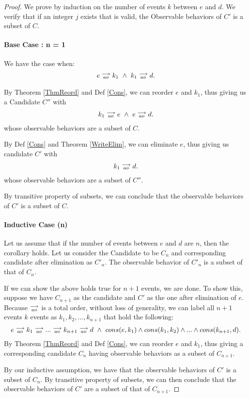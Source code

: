 \begin{proof}
    We prove by induction on the number of events $k$ between $e$ and $d$.
    We verify that if an integer $j$ exists that is valid, the Observable behaviors of $C'$ is a subset of $C$.

    \paragraph{Base Case : n = 1}

        We have the case when:
        \begin{align*}
            e\stackrel{\longrightarrow}{_{ao}}k_1 \ \wedge \ k_1\stackrel{\longrightarrow}{_{ao}}d.
        \end{align*}

        By Theorem \ref{ThmReord} and Def \ref{Cons}, we can reorder $e$ and $k_1$, thus giving us a Candidate $C''$ with 
        \begin{align*}
            k_1\stackrel{\longrightarrow}{_{ao}}e \ \wedge \ e\stackrel{\longrightarrow}{_{ao}}d.
        \end{align*}  
        whose observable behaviors are a subset of $C$.

        By Def \ref{Cons} and Theorem \ref{WriteElim}, we can eliminate $e$, thus giving us candidate $C'$  with  
        \begin{align*}
            k_1\stackrel{\longrightarrow}{_{ao}}d.
        \end{align*} 
        whose observable behaviors are a subset of $C''$.

        By transitive property of subsets, we can conclude that the observable behaviors of $C'$ is a subset of $C$. 
    \paragraph{Inductive Case (n)}

        Let us assume that if the number of events between $e$ and $d$ are $n$, then the corollary holds. 
        Let us consider the Candidate to be $C_n$ and corresponding candidate after elimination as $C'_n$. 
        The observable behavior of $C'_n$ is a subset of that of $C_n$.

        If we can show the above holds true for $n+1$ events, we are done.
        To show this, suppose we have $C_{n+1}$ as the candidate and $C'$ as the one after elimination of $e$. 
        Because $\stackrel{\longrightarrow}{_{ao}}$ is a total order, without loss of generality, we can label all $n+1$ events $k$ events as  $k_1, k_2 , ... , k_{n+1}$ that hold the following:
        \begin{align*}
            \reln{e}{ao}{\reln{k_1}{ao}{\reln{...}{ao}{\reln{k_{n+1}}{ao}{d}}}} 
            \ \wedge \ 
            cons(e,k_1) \wedge cons(k_1, k_2) \wedge ... \wedge cons(k_{n+1}, d). 
        \end{align*}
        By Theorem \ref{ThmReord} and Def \ref{Cons}, we can reorder $e$ and $k_1$, thus giving a corresponding candidate $C_n$ having observable behaviors as a subset of $C_{n+1}$. 

        By our inductive assumption, we have that the observable behaviors of $C'$ is a subset of $C_n$. 
        By transitive property of subsets, we can then conclude that the observable behaviors of $C'$ are a subset of that of $C_{n+1}$.

\end{proof}
